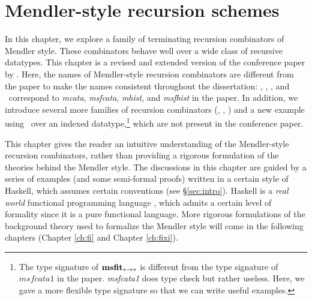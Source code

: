 \chapter{Mendler-style recursion schemes}\label{ch:mendler}
In this chapter, we explore a family of terminating recursion combinators
of Mendler style. These combinators behave well over a wide class of
recursive datatypes. This chapter is a revised and extended version of
the conference paper by \citet{AhnShe11}. Here, the names of Mendler-style
recursion combinators are different from the paper to make the names
consistent throughout the dissertation: \MIt, \MsfIt, \McvIt, and
\MsfcvIt\ correspond to \textit{mcata}, \textit{msfcata}, \textit{mhist},
and \textit{msfhist} in the paper. In addition, we introduce several
more families of recursion combinators (\MPr, \McvIt, \McvPr)
and a new example using \MsfIt\ over an indexed datatype,\footnote{
	The type signature of $\mathbf{msfit}_{* -> *}$ is different
	from the type signature of $\textit{msfcata1}$ in the paper. 
	\textit{msfcata1} does type check but rather useless.
	Here, we gave a more flexible type signature
	so that we can write useful examples.}
which are not present in the conference paper.

This chapter gives the reader an intuitive understanding of the Mendler-style
recursion combinators, rather than providing a rigorous formulation of
the theories behind the Mendler style. The discussions in this chapter
are guided by a series of examples (and some semi-formal proofs) written
in a certain style of Haskell, which assumes certain conventions
(see \S\ref{sec:intro}).  Haskell is a \emph{real world}
functional programming language \cite{OSullivan08}, which admits
a certain level of formality since it is a pure functional language.
More rigorous formulations of the background theory used to formalize
the Mendler style will come in the following chapters
(Chapter \ref{ch:fi} and Chapter \ref{ch:fixi}).






